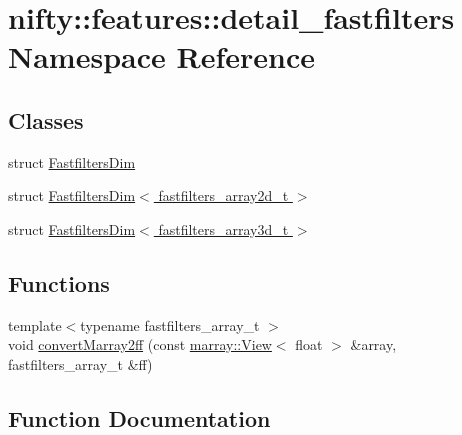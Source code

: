 \hypertarget{namespacenifty_1_1features_1_1detail__fastfilters}{}\section{nifty\+:\+:features\+:\+:detail\+\_\+fastfilters Namespace Reference}
\label{namespacenifty_1_1features_1_1detail__fastfilters}
\subsection*{Classes}
\begin{DoxyCompactItemize}
\item 
struct \hyperlink{structnifty_1_1features_1_1detail__fastfilters_1_1FastfiltersDim}{Fastfilters\+Dim}
\item 
struct \hyperlink{structnifty_1_1features_1_1detail__fastfilters_1_1FastfiltersDim_3_01fastfilters__array2d__t_01_4}{Fastfilters\+Dim$<$ fastfilters\+\_\+array2d\+\_\+t $>$}
\item 
struct \hyperlink{structnifty_1_1features_1_1detail__fastfilters_1_1FastfiltersDim_3_01fastfilters__array3d__t_01_4}{Fastfilters\+Dim$<$ fastfilters\+\_\+array3d\+\_\+t $>$}
\end{DoxyCompactItemize}
\subsection*{Functions}
\begin{DoxyCompactItemize}
\item 
{\footnotesize template$<$typename fastfilters\+\_\+array\+\_\+t $>$ }\\void \hyperlink{namespacenifty_1_1features_1_1detail__fastfilters_a41cdd24872d9ad84d89616e7c68eec05}{convert\+Marray2ff} (const \hyperlink{classandres_1_1View}{marray\+::\+View}$<$ float $>$ \&array, fastfilters\+\_\+array\+\_\+t \&ff)
\end{DoxyCompactItemize}


\subsection{Function Documentation}
\hypertarget{namespacenifty_1_1features_1_1detail__fastfilters_a41cdd24872d9ad84d89616e7c68eec05}{}
